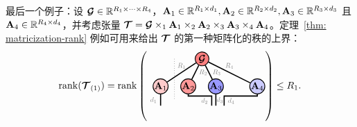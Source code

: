 最后一个例子：设 $\bm{\mathcal{G}}\in\mathbb{R}^{R_1\times\cdots\times R_4}$，$\mathbf{A}_1\in\mathbb{R}^{R_1\times d_1}, \mathbf{A}_2\in\mathbb{R}^{R_2\times d_2},\mathbf{A}_3\in\mathbb{R}^{R_3\times d_3}$ 且 $\mathbf{A}_4\in\mathbb{R}^{R_4\times d_4}$，并考虑张量 $\bm{\mathcal{T}} = \bm{\mathcal{G}} \times_1 \mathbf{A}_1\times_2 \mathbf{A}_2\times_3 \mathbf{A}_3\times_4 \mathbf{A}_4$。定理~\ref{thm: matricization-rank} 例如可用来给出 $\bm{\mathcal{T}}$ 的第一种矩阵化的秩的上界：
$$
\rank(\Tt_{(1)}) = 
\rank\left(
\begin{tikzpicture}[baseline=-0.5ex]
    \tikzset{tensor/.style = {minimum size = 0.5cm,shape = circle,thick,draw=black,inner sep = 0pt}, edge/.style = {thick,line width=.4mm},every loop/.style={}}
    \def\x{6}
    \def\y{0} 
    \node[tensor,fill=red!50!white] (G) at (\x+4.5,\y+1) {$\Gt$};
    \node[tensor,fill=red!20!white] (A_1) at (\x+3,\y){$\Ab_1$};
    \node[tensor,fill=red!40!white] (A_2) at (\x+4,\y){$\Ab_2$};
    \node[tensor, fill=blue!40!white] (A_3) at (\x+5,\y){$\Ab_3$};
    \node[tensor,fill=blue!20!white] (A_4) at (\x+6.5,\y){$\Ab_4$};
    \draw[edge] (G) -- (A_1) node [midway, above] {\scalebox{0.7}{\dimcolor{$R_1$}}};
    \draw[edge] (G) -- (A_2) node [midway, right] {\scalebox{0.7}{\dimcolor{$R_2$}}};
    \draw[edge] (G) -- (A_3) node [midway, right] {\scalebox{0.7}{\dimcolor{$R_3$}}};
    \draw[edge] (G) -- (A_4) node [midway, above] {\scalebox{0.7}{\dimcolor{$R_4$}}};
    \draw[edge] (A_1) -- (\x+3,\y-0.7) node [midway, left] {\scalebox{0.7}{\dimcolor{$d_1$}}};
    \draw[edge] (A_3) -- (\x+5,\y-0.7) node [midway, right=-0.11cm] {\scalebox{0.7}{\dimcolor{$d_3$}}};
    \draw[edge] (A_2) -- (\x+4,\y-0.35) -- (\x+4.85,\y-0.35) -- (\x+4.85,\y-0.7) node [midway, left] {\scalebox{0.7}{\dimcolor{$d_2$}}};
    \draw[edge] (A_4) -- (\x+6.5,\y-0.35) -- (\x+5.30,\y-0.35) -- (\x+5.30,\y-0.7) node [midway, right] {\scalebox{0.7}{\dimcolor{$d_4$}}};
    \draw[dotted](\x+3.5,\y+1)-- (\x+3.5,\y-0.5);
    \end{tikzpicture}\right)\leq R_1.
$$
